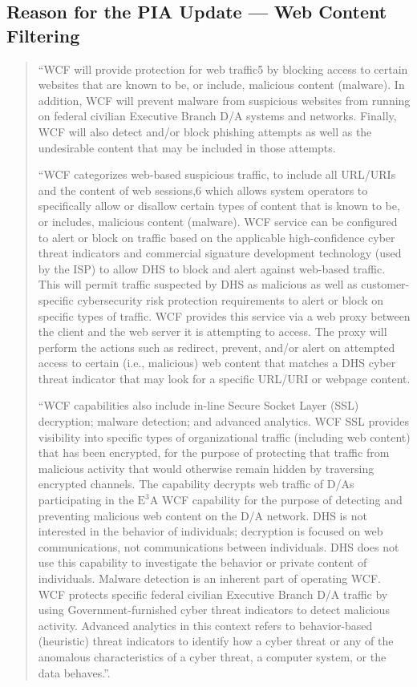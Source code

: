 \documentclass[fleqn,10pt]{wlscirep}
\newcommand{\ETA}{$\textrm{E}^\textrm{3}\textrm{A}$\xspace}
\begin{document}
\subsection{Reason for the PIA Update --- Web Content Filtering}\label{excerpt4}
\begin{quote}
``WCF will provide protection for web traffic5
by blocking
access to certain websites that are known to be, or include, malicious content (malware). In
addition, WCF will prevent malware from suspicious websites from running on federal civilian
Executive Branch D/A systems and networks. Finally, WCF will also detect and/or block phishing
attempts as well as the undesirable content that may be included in
those attempts.

``WCF categorizes web-based suspicious traffic, to include all URL/URIs and the content of web sessions,6 which allows system operators to specifically allow or disallow certain types of content that is known to be, or includes, malicious content (malware). WCF service can be configured to alert or block on traffic based on the applicable high-confidence cyber threat indicators and commercial signature development technology (used by the ISP) to allow DHS to block and alert against web-based traffic. This will permit traffic suspected by DHS as malicious as well as customer-specific cybersecurity risk protection requirements to alert or block on specific types of traffic. WCF provides this service via a web proxy between the client and the web server it is attempting to access. The proxy will perform the actions such as redirect, prevent, and/or alert on attempted access to certain (i.e., malicious) web content that matches a DHS cyber threat indicator that may look for a specific URL/URI or webpage content.

``WCF capabilities also include in-line Secure Socket Layer (SSL)
decryption; malware detection; and advanced analytics. WCF SSL
provides visibility into specific types of organizational traffic
(including web content) that has been encrypted, for the purpose of
protecting that traffic from malicious activity that would otherwise
remain hidden by traversing encrypted channels. The capability
decrypts web traffic of D/As participating in the \ETA WCF capability
for the purpose of detecting and preventing malicious web content on
the D/A network.  DHS is not interested in the behavior of
individuals; decryption is focused on web communications, not
communications between individuals. DHS does not use this capability
to investigate the behavior or private content of individuals. Malware
detection is an inherent part of operating WCF. WCF protects specific
federal civilian Executive Branch D/A traffic by using
Government-furnished cyber threat indicators to detect malicious
activity. Advanced analytics in this context refers to behavior-based
(heuristic) threat indicators to identify how a cyber threat or any of
the anomalous characteristics of a cyber threat, a computer system, or
the data behaves.''\cite[pp 2--3]{dhs-e3a-pia2}.
\end{quote}
\end{document}
